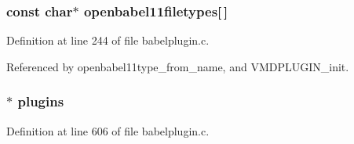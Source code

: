 \subsubsection{\setlength{\rightskip}{0pt plus 5cm}const char$\ast$ openbabel11filetypes[$\,$]\hspace{0.3cm}{\tt  [static]}}\label{babelplugin_8c_a3}




Definition at line 244 of file babelplugin.c.

Referenced by openbabel11type\_\-from\_\-name, and VMDPLUGIN\_\-init.
\subsubsection{$\ast$ plugins\hspace{0.3cm}{\tt  [static]}}\label{babelplugin_8c_a5}




Definition at line 606 of file babelplugin.c.